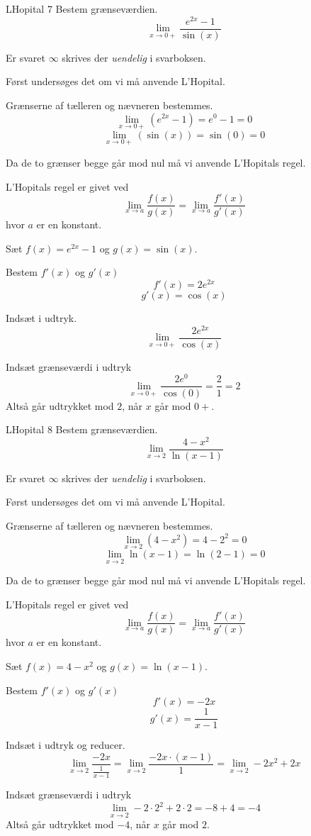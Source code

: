 \documentclass{article}
\begin{document}
\begin{exercise}{LHopital 7}
Bestem grænseværdien.
\[
\lim_{x \to 0+} \frac{e^{2x} - 1}{\sin(x)}
\] 

Er svaret $\infty$ skrives der \emph{uendelig} i svarboksen.


\hint
Først undersøges det om vi må anvende L'Hopital.

\hint
Grænserne af tælleren og nævneren bestemmes.
\[
\lim_{x \to 0+} (e^{2x} - 1) = e^{0} - 1 = 0 
\]
\[
\lim_{x \to 0+} (\sin(x)) = \sin(0) = 0
\]

\hint
Da de to grænser begge går mod nul må vi  anvende L'Hopitals regel. 

\hint
L'Hopitals regel er givet ved
\[
\lim_{x \to a} \frac{f(x)}{g(x)} = \lim_{x \to a} \frac{f'(x)}{g'(x)} 
\]
hvor $a$  er en konstant.

\hint
Sæt $f(x) = e^{2x} - 1 $ og $g(x) = \sin(x)$. 

\hint
Bestem $f'(x)$ og $g'(x)$
\[
f'(x) = 2 e^{2x}
\]
\[
g'(x) = \cos(x)
\]

\hint
Indsæt i udtryk.
\[
\lim_{x \to 0+} \frac{2 e^{2x}}{\cos(x)} 
\]

\hint
Indsæt grænseværdi i udtryk
\[
\lim_{x \to 0+} \frac{2 e^{0}}{\cos(0)}  =  \frac{2}{1} = 2 
\]
Altså går udtrykket mod $2$, når $x$ går mod $0+$. 

\end{exercise}

\begin{exercise}{LHopital 8}
Bestem grænseværdien.
\[
\lim_{x \to 2} \frac{4 - x^2}{\ln(x - 1)}
\] 

Er svaret $\infty$ skrives der \emph{uendelig} i svarboksen.


\hint
Først undersøges det om vi må anvende L'Hopital.

\hint
Grænserne af tælleren og nævneren bestemmes.
\[
\lim_{x \to 2} (4 - x^2) = 4 - 2^2 = 0
\]
\[
\lim_{x \to 2} \ln(x - 1) = \ln(2 - 1) = 0
\]

\hint
Da de to grænser begge går mod nul må vi  anvende L'Hopitals regel. 

\hint
L'Hopitals regel er givet ved
\[
\lim_{x \to a} \frac{f(x)}{g(x)} = \lim_{x \to a} \frac{f'(x)}{g'(x)} 
\]
hvor $a$  er en konstant.

\hint
Sæt $f(x) = 4 - x^2$ og $g(x) = \ln(x-1)$. 

\hint
Bestem $f'(x)$ og $g'(x)$
\[
f'(x) = -2 x 
\]
\[
g'(x) = \frac{1}{x-1}
\]

\hint
Indsæt i udtryk og reducer. 
\[
\lim_{x \to 2} \frac{-2x}{\frac{1}{x-1}} = \lim_{x \to 2} \frac{-2x \cdot (x-1)}{1} = \lim_{x \to 2} -2x^2 + 2x
\]

\hint
Indsæt grænseværdi i udtryk
\[
\lim_{x \to 2} -2 \cdot 2^2 + 2 \cdot 2 = -8 + 4 = -4
\]
Altså går udtrykket mod $-4$, når $x$ går mod $2$. 

\end{exercise}
\end{document}
